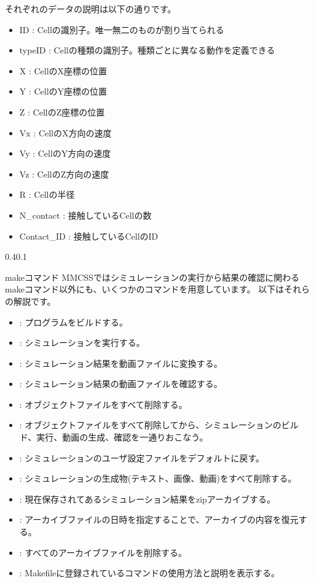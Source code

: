 \documentclass[vipdfmx,a4paper,11pt]{jsarticle}
\makeatletter
\renewcommand{\subsection}{%
  \@startsection{subsection}{1}{\z@}%
  {0.4\Cvs}{0.1\Cvs}%
  {\normalfont\large\headfont\raggedright}}
\makeatother
\begin{document}
それぞれのデータの説明は以下の通りです。

\begin{itemize}
  \item ID : Cellの識別子。唯一無二のものが割り当てられる
  \item typeID : Cellの種類の識別子。種類ごとに異なる動作を定義できる
  \item X : CellのX座標の位置
  \item Y : CellのY座標の位置
  \item Z : CellのZ座標の位置
  \item Vx : CellのX方向の速度
  \item Vy : CellのY方向の速度
  \item Vz : CellのZ方向の速度
  \item R : Cellの半径
  \item N\_contact : 接触しているCellの数
  \item Contact\_ID : 接触しているCellのID
\end{itemize}

\subsection{makeコマンド}\label{make}
MMCSSではシミュレーションの実行から結果の確認に関わるmakeコマンド以外にも、いくつかのコマンドを用意しています。
以下はそれらの解説です。

\begin{itemize}
  \item {} : プログラムをビルドする。
  \item {} : シミュレーションを実行する。
  \item {} : シミュレーション結果を動画ファイルに変換する。
  \item {} : シミュレーション結果の動画ファイルを確認する。
  \item {} : オブジェクトファイルをすべて削除する。
  \item {} : オブジェクトファイルをすべて削除してから、シミュレーションのビルド、実行、動画の生成、確認を一通りおこなう。
  \item {} : シミュレーションのユーザ設定ファイルをデフォルトに戻す。
  \item {} : シミュレーションの生成物(テキスト、画像、動画)をすべて削除する。
  \item {} : 現在保存されてあるシミュレーション結果をzipアーカイブする。
  \item {} : アーカイブファイルの日時を指定することで、アーカイブの内容を復元する。
  \item {} : すべてのアーカイブファイルを削除する。
  \item {} : Makefileに登録されているコマンドの使用方法と説明を表示する。
\end{itemize}
\end{document}
